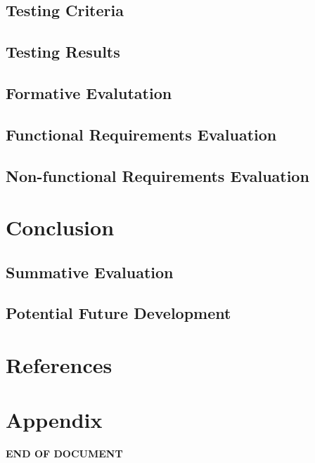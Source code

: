 \documentclass{report}
\begin{document}
	\section{Testing Criteria}
	\section{Testing Results}
	\section{Formative Evalutation}
	\section{Functional Requirements Evaluation}
	\section{Non-functional Requirements Evaluation}

\chapter{Conclusion}
	\section{Summative Evaluation}
	\section{Potential Future Development}


\chapter{References}

\chapter{Appendix}

\newpage
\vspace*{\fill}
\begin{center}
\textbf{END OF DOCUMENT}
\end{center}
\vfill
\end{document}

